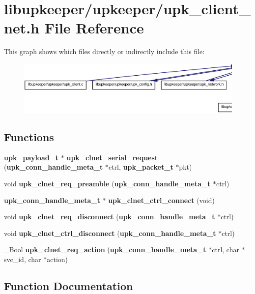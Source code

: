 \section{libupkeeper/upkeeper/upk\_\-client\_\-net.h File Reference}
\label{upk__client__net_8h}
This graph shows which files directly or indirectly include this file:
\nopagebreak
\begin{figure}[H]
\begin{center}
\leavevmode
\includegraphics[width=400pt]{upk__client__net_8h__dep__incl}
\end{center}
\end{figure}
\subsection*{Functions}
\begin{DoxyCompactItemize}
\item 
{\bf upk\_\-payload\_\-t} $\ast$ {\bf upk\_\-clnet\_\-serial\_\-request} ({\bf upk\_\-conn\_\-handle\_\-meta\_\-t} $\ast$ctrl, {\bf upk\_\-packet\_\-t} $\ast$pkt)
\item 
void {\bf upk\_\-clnet\_\-req\_\-preamble} ({\bf upk\_\-conn\_\-handle\_\-meta\_\-t} $\ast$ctrl)
\item 
{\bf upk\_\-conn\_\-handle\_\-meta\_\-t} $\ast$ {\bf upk\_\-clnet\_\-ctrl\_\-connect} (void)
\item 
void {\bf upk\_\-clnet\_\-req\_\-disconnect} ({\bf upk\_\-conn\_\-handle\_\-meta\_\-t} $\ast$ctrl)
\item 
void {\bf upk\_\-clnet\_\-ctrl\_\-disconnect} ({\bf upk\_\-conn\_\-handle\_\-meta\_\-t} $\ast$ctrl)
\item 
\_\-Bool {\bf upk\_\-clnet\_\-req\_\-action} ({\bf upk\_\-conn\_\-handle\_\-meta\_\-t} $\ast$ctrl, char $\ast$svc\_\-id, char $\ast$action)
\end{DoxyCompactItemize}


\subsection{Function Documentation}
